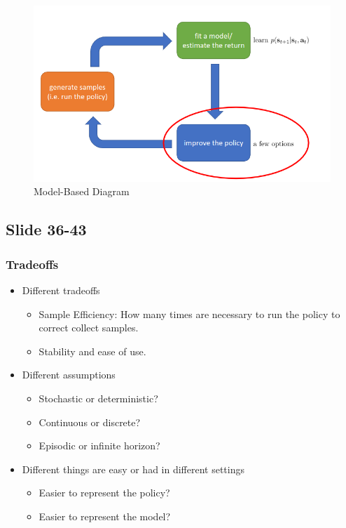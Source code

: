 \documentclass[]{article}
\begin{document}
\begin{figure}
\begin{center}
    \includegraphics[scale=0.5]{cap3img/modelbasedrl.png}
\end{center}
\caption{Model-Based Diagram}
\label{fig:modelbased}
\end{figure}


\subsection*{Slide 36-43}%
\label{sub:Slide 36-43}

\subsubsection*{Tradeoffs}
\label{sub:Tradeoffs}

\begin{itemize}
    \item Different tradeoffs
        \begin{itemize}
            \item Sample Efficiency: How many times are necessary to run the policy to correct collect samples.
            \item Stability and ease of use.
        \end{itemize}
    \item Different assumptions
        \begin{itemize}
            \item Stochastic or deterministic?
            \item Continuous or discrete?
            \item Episodic or infinite horizon?
        \end{itemize}
    \item Different things are easy or had in different settings
        \begin{itemize}
            \item Easier to represent the policy?
            \item Easier to represent the model?
        \end{itemize}
\end{itemize}
\end{document}
